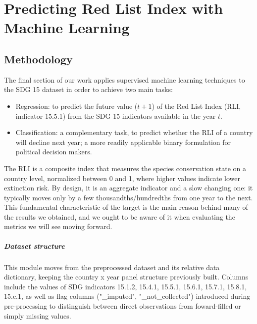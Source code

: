 \chapter{Predicting Red List Index with Machine Learning}

\section{Methodology}
The final section of our work applies supervised machine learning techniques to the SDG 15 dataset in order to achieve two main tasks:
\begin{itemize}
    \item Regression: to predict the future value ($t + 1$) of the Red List Index (RLI, indicator 15.5.1) from the SDG 15 indicators available in the year $t$.
    \item Classification: a complementary task, to predict whether the RLI of a country will decline next year; a more readily applicable binary formulation for political decision makers.
\end{itemize}
The RLI is a composite index that measures the species conservation state on a country level, normalized between 0 and 1, where higher values indicate lower extinction risk. By design, it is an aggregate indicator and a slow changing one: it typically moves only by a few thousandths/hundredths from one year to the next. This fundamental characteristic of the target is the main reason behind many of the results we obtained, and we ought to be aware of it when evaluating the metrics we will see moving forward.

\paragraph{Dataset structure} This module moves from the preprocessed dataset and its relative data dictionary, keeping the country x year panel structure previously built. Columns include the values of SDG indicators 15.1.2, 15.4.1, 15.5.1, 15.6.1, 15.7.1, 15.8.1, 15.c.1, as well as flag columns ("\_imputed", "\_not\_collected") introduced during pre-processing to distinguish between direct observations from foward-filled or simply missing values.

